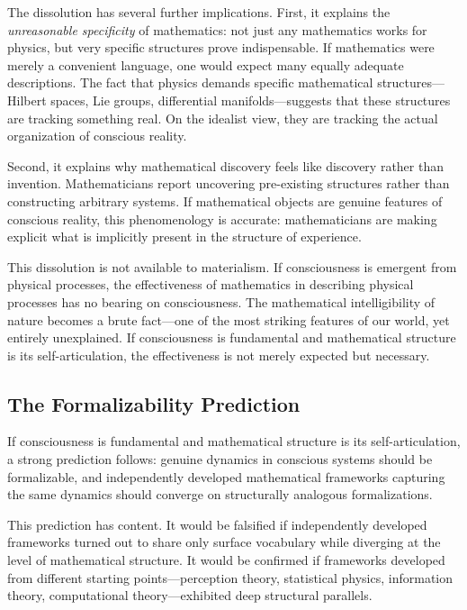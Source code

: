 \documentclass[11pt,a4paper]{article}
\theoremstyle{definition}
\theoremstyle{plain}
\theoremstyle{remark}
\begin{document}
The dissolution has several further implications. First, it explains the \textit{unreasonable specificity} of mathematics: not just any mathematics works for physics, but very specific structures prove indispensable. If mathematics were merely a convenient language, one would expect many equally adequate descriptions. The fact that physics demands specific mathematical structures---Hilbert spaces, Lie groups, differential manifolds---suggests that these structures are tracking something real. On the idealist view, they are tracking the actual organization of conscious reality.

Second, it explains why mathematical discovery feels like discovery rather than invention. Mathematicians report uncovering pre-existing structures rather than constructing arbitrary systems. If mathematical objects are genuine features of conscious reality, this phenomenology is accurate: mathematicians are making explicit what is implicitly present in the structure of experience.

This dissolution is not available to materialism. If consciousness is emergent from physical processes, the effectiveness of mathematics in describing physical processes has no bearing on consciousness. The mathematical intelligibility of nature becomes a brute fact---one of the most striking features of our world, yet entirely unexplained. If consciousness is fundamental and mathematical structure is its self-articulation, the effectiveness is not merely expected but necessary.

\subsection{The Formalizability Prediction}\label{sec:formalizability}

If consciousness is fundamental and mathematical structure is its self-articulation, a strong prediction follows: genuine dynamics in conscious systems should be formalizable, and independently developed mathematical frameworks capturing the same dynamics should converge on structurally analogous formalizations.

This prediction has content. It would be falsified if independently developed frameworks turned out to share only surface vocabulary while diverging at the level of mathematical structure. It would be confirmed if frameworks developed from different starting points---perception theory, statistical physics, information theory, computational theory---exhibited deep structural parallels.
\end{document}
